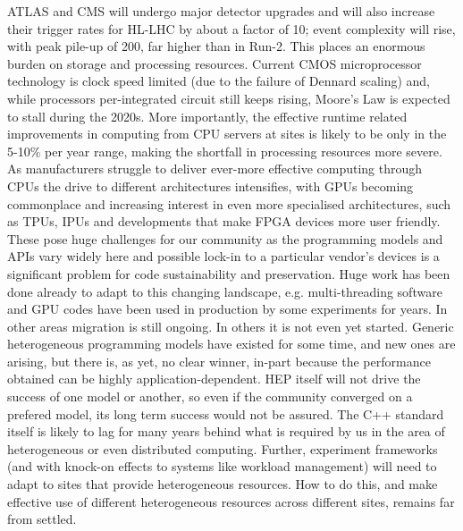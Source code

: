 \documentclass[10pt,a4paper]{article}
\begin{document}
ATLAS and CMS will undergo major detector upgrades and will also
increase their trigger rates for HL-LHC by about a factor of 10; event
complexity will rise, with peak pile-up of 200, far higher than in
Run-2. This places an enormous burden on storage and processing
resources. Current CMOS microprocessor technology is clock speed limited
(due to the failure of Dennard scaling) and, while processors
per-integrated circuit still keeps rising, Moore's Law is expected to
stall during the 2020s. More importantly, the effective runtime related
improvements in computing from CPU servers at sites is likely to be only
in the 5-10\% per year range, making the shortfall in processing
resources more severe. As manufacturers struggle to deliver ever-more
effective computing through CPUs the drive to different architectures
intensifies, with GPUs becoming commonplace and increasing interest in
even more specialised architectures, such as TPUs, IPUs and developments
that make FPGA devices more user friendly. These pose huge challenges
for our community as the programming models and APIs vary widely here
and possible lock-in to a particular vendor's devices is a significant
problem for code sustainability and preservation. Huge work has been
done already to adapt to this changing landscape, e.g. multi-threading
software and GPU codes have been used in production by some experiments
for years. In other areas migration is still ongoing. In others it is
not even yet started. Generic heterogeneous programming models have
existed for some time, and new ones are arising, but there is, as yet,
no clear winner, in-part because the performance obtained can be highly
application-dependent. HEP itself will not drive the success of one
model or another, so even if the community converged on a prefered
model, its long term success would not be assured. The C++ standard
itself is likely to lag for many years behind what is required by us in
the area of heterogeneous or even distributed computing. Further,
experiment frameworks (and with knock-on effects to systems like
workload management) will need to adapt to sites that provide
heterogeneous resources. How to do this, and make effective use of
different heterogeneous resources across different sites, remains far
from settled.
\end{document}
